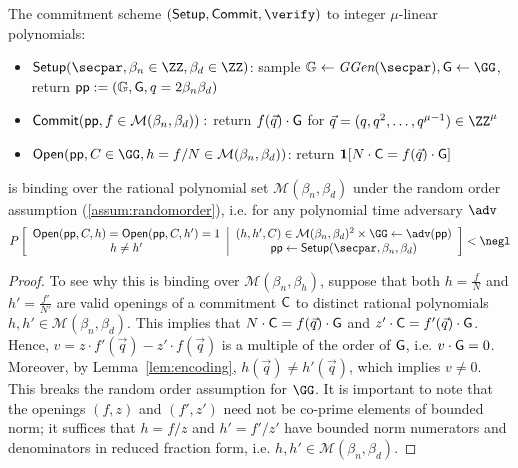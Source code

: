 \begin{lemma}
\label{lem:darkcommit}
	The commitment scheme $(\setup,\commit, \verify)$ to integer $\mu$-linear polynomials: 
	\begin{itemize} 
	\item $\setup(\secpar,\beta_n\in \ZZ,\beta_d \in \ZZ)$: sample $\mathbb{G} \gets \ggen(\secpar) ,\Generator \gets \GG$, return $\crs := (\mathbb{G}, \gr{G}, q =2 \beta_n\beta_d)$
	\item $\textsf{{Commit}}(\textsf{pp},f\in \mathcal{M}(\beta_n,\beta_d)):$ return $f(\vec{q}) \cdot \gr{G} $ for $\vec{q}=(q,q^2,\dots,q^{\mu-1})\in \ZZ^{\mu}$
	\item $\open(\crs,C\in \GG,h = f/N  \in \mathcal{M}(\beta_n,\beta_d) )$: return $\predicate{N\cdot\Commitment = f(\vec{q})\cdot \Generator} $
	\end{itemize} 
	is binding over the rational polynomial set $\mathcal{M}(\beta_n, \beta_d)$ under the random order assumption (\ref{assum:randomorder}), i.e. for any polynomial time adversary $\adv$ $$P\left[\begin{array}{c} 
	\open(\crs,C,h)=\open(\crs,C,h')=1\\
	h\neq h' 
\end{array}
 \middle|\begin{array}{c}
(h,h',C) \in \mathcal{M}(\beta_n,\beta_d)^2 \times \GG  \gets \adv(\crs)\\	
\crs \gets \setup(\secpar,\beta_n,\beta_d)
\end{array}
	 \right]<\negl$$
\end{lemma}
\begin{proof}
To see why this is binding over $\mathcal{M}(\beta_n, \beta_h)$, suppose that both $h=\frac{f}{N}$ and $h'=\frac{f'}{N'}$ are valid openings of a commitment $\gr{C}$ to distinct rational polynomials $h, h' \in \mathcal{M}(\beta_n, \beta_d)$. This implies that $N\cdot \gr{C} = f(\vec{q}) \cdot \gr{G}$ and $z' \cdot \gr{C} = f'(\vec{q}) \cdot \gr{G}$. Hence, $v =  z \cdot f'(\vec{q}) - z' \cdot f(\vec{q})$ is a multiple of the order of $\gr{G}$, i.e. $v \cdot \gr{G} = 0$. Moreover, by Lemma~\ref{lem:encoding}, $h(\vec{q}) \neq h'(\vec{q})$, which implies $v \neq 0$. This breaks the random order assumption for $\GG$. It is important to note that the openings $(f, z)$ and $(f', z')$ need not be co-prime elements of bounded norm; it suffices that $h = f/z$ and $h' = f'/z'$ have bounded norm numerators and denominators in reduced fraction form, i.e. $h, h' \in \mathcal{M}(\beta_n, \beta_d)$. 
\end{proof}




